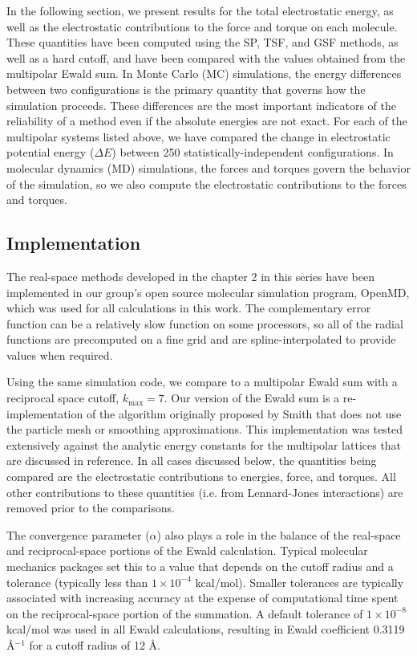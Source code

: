 In the following section, we present results for the total
electrostatic energy, as well as the electrostatic contributions to
the force and torque on each molecule.  These quantities have been
computed using the SP, TSF, and GSF methods, as well as a hard cutoff,
and have been compared with the values obtained from the multipolar
Ewald sum.  In Monte Carlo (MC) simulations, the energy differences
between two configurations is the primary quantity that governs how
the simulation proceeds. These differences are the most important
indicators of the reliability of a method even if the absolute
energies are not exact.  For each of the multipolar systems listed
above, we have compared the change in electrostatic potential energy
($\Delta E$) between 250 statistically-independent configurations.  In
molecular dynamics (MD) simulations, the forces and torques govern the
behavior of the simulation, so we also compute the electrostatic
contributions to the forces and torques.

\subsection{Implementation}
The real-space methods developed in the chapter 2 in this series
have been implemented in our group's open source molecular simulation
program, OpenMD,\cite{openmd} which was used for all calculations in
this work.  The complementary error function can be a relatively slow
function on some processors, so all of the radial functions are
precomputed on a fine grid and are spline-interpolated to provide
values when required.  

Using the same simulation code, we compare to a multipolar Ewald sum
with a reciprocal space cutoff, $k_\mathrm{max} = 7$.  Our version of
the Ewald sum is a re-implementation of the algorithm originally
proposed by Smith that does not use the particle mesh or smoothing
approximations.\cite{Smith82,Smith98} This implementation was tested
extensively against the analytic energy constants for the multipolar
lattices that are discussed in reference.\cite{PaperI} In all
cases discussed below, the quantities being compared are the
electrostatic contributions to energies, force, and torques.  All
other contributions to these quantities (i.e. from Lennard-Jones
interactions) are removed prior to the comparisons.

The convergence parameter ($\alpha$) also plays a role in the balance
of the real-space and reciprocal-space portions of the Ewald
calculation.  Typical molecular mechanics packages set this to a value
that depends on the cutoff radius and a tolerance (typically less than
$1 \times 10^{-4}$ kcal/mol).  Smaller tolerances are typically
associated with increasing accuracy at the expense of computational
time spent on the reciprocal-space portion of the
summation.\cite{Perram88,Essmann95} A default tolerance of $1 \times
10^{-8}$ kcal/mol was used in all Ewald calculations, resulting in
Ewald coefficient 0.3119 \AA$^{-1}$ for a cutoff radius of 12 \AA.

